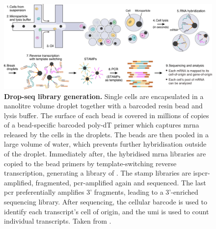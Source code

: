 \begin{figure}[ht]
	\centerfloat
	\includegraphics[width=\textwidth]{./ims/macosko2015_3.png}
	\caption[Drop-seq library generation]{\textbf{Drop-seq library generation.} Single cells are encapsulated in a nanolitre volume droplet together with a barcoded resin bead and lysis buffer. The surface of each bead is covered in millions of copies of a bead-specific barcoded poly-dT primer which captures \acrshort{mrna} released by the cells in the droplets. The beads are then pooled in a large volume of water, which prevents further hybridisation outside of the droplet. Immediately after, the hybridised \acrshort{mrna} libraries are copied to the bead primers by template-switching reverse transcription, generating a library of . The \acrshort{stamp} libraries are \acrshort{ispcr}-amplified, fragmented, \acrshort{pcr}-amplified again and sequenced. The last \acrshort{pcr} preferentially amplifies 3' fragments, leading to a 3'-enriched sequencing library. After sequencing, the cellular barcode is used to identify each transcript's cell of origin, and the \acrshort{umi} is used to count individual transcripts. Taken from \cite{macosko2015}.}
	\label{fig:macosko2015_3}
\end{figure}

